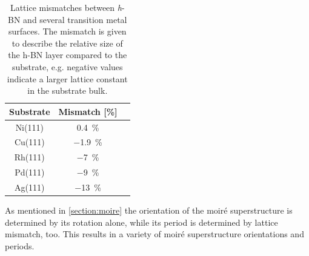 \begin{table}\centering
\caption{Lattice mismatches between \textit{h}-BN and several transition metal surfaces. The mismatch is given to describe the relative size of the h-BN layer compared to the substrate, e.g. negative values indicate a larger lattice constant in the substrate bulk.}

	\begin{tabular}{ccc}
	Substrate 	& Mismatch [\%] \\ \hline
	Ni(111)		& \SI{+0.4}{\percent} \\
	Cu(111)		& \SI{-1.9}{\percent} \\	
	Rh(111)		& \SI{-7}{\percent} \\	
	Pd(111)		& \SI{-9}{\percent} \\
	Ag(111)		& \SI{-13}{\percent} \\

\end{tabular}
\label{tab:h-BN-mismatch}
\end{table}

As mentioned in \autoref{section:moire} the orientation of the moir\'e superstructure is determined by its rotation alone, while its period is determined by lattice mismatch, too. This results in a variety of moir\'e superstructure orientations and periods.



